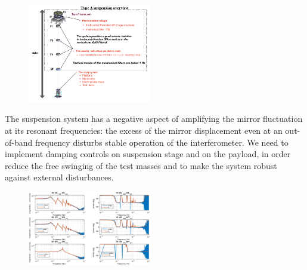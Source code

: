 \begin{figure}[hbtp]
\begin{center}
\includegraphics[width=0.48\textwidth]{astrodiv/gw/vis-a/TypeAoverwiew.jpeg}
\caption{\utsm {}}
\label{fig:TytpeA}

\end{center}
\end{figure}
The suspension system has a negative aspect of amplifying the mirror fluctuation at its resonant frequencies: the excess of the mirror displacement even at an out-of-band frequency disturbs stable operation of the interferometer. We need to implement damping controls on suspension stage and on the payload, in order reduce the free swinging of the test masses and to make the system robust against external disturbances. 
\begin{figure}[hbtp]
\begin{center}
\includegraphics[width=0.48\textwidth]{astrodiv/gw/vis-a/TypeATF.eps}
\caption{\utsm {}}
\label{fig:TytpeATF}

\end{center}
\end{figure}

